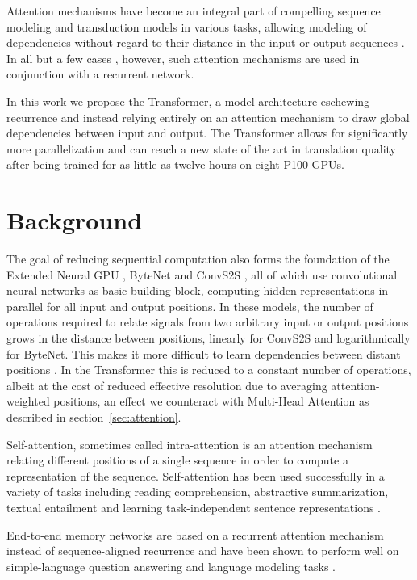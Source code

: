 Attention mechanisms have become an integral part of compelling sequence modeling and transduction models in various tasks, allowing modeling of dependencies without regard to their distance in the input or output sequences \citep{bahdanau2014neural, structuredAttentionNetworks}. In all but a few cases \citep{decomposableAttnModel}, however, such attention mechanisms are used in conjunction with a recurrent network.

In this work we propose the Transformer, a model architecture eschewing recurrence and instead relying entirely on an attention mechanism to draw global dependencies between input and output. The Transformer allows for significantly more parallelization and can reach a new state of the art in translation quality after being trained for as little as twelve hours on eight P100 GPUs. 


\section{Background}

The goal of reducing sequential computation also forms the foundation of the Extended Neural GPU \citep{extendedngpu}, ByteNet \citep{NalBytenet2017} and ConvS2S \citep{JonasFaceNet2017}, all of which use convolutional neural networks as basic building block, computing hidden representations in parallel for all input and output positions. In these models, the number of operations required to relate signals from two arbitrary input or output positions grows in the distance between positions, linearly for ConvS2S and logarithmically for ByteNet. This makes it more difficult to learn dependencies between distant positions \citep{hochreiter2001gradient}. In the Transformer this is reduced to a constant number of operations, albeit at the cost of reduced effective resolution due to averaging attention-weighted positions, an effect we counteract with Multi-Head Attention as described in section~\ref{sec:attention}. 

Self-attention, sometimes called intra-attention is an attention mechanism relating different positions of a single sequence in order to compute a representation of the sequence. Self-attention has been used successfully in a variety of tasks including reading comprehension, abstractive summarization, textual entailment and learning task-independent sentence representations \citep{cheng2016long, decomposableAttnModel, paulus2017deep, lin2017structured}.

End-to-end memory networks are based on a recurrent attention mechanism instead of sequence-aligned recurrence and have been shown to perform well on simple-language question answering and language modeling tasks \citep{sukhbaatar2015}.

